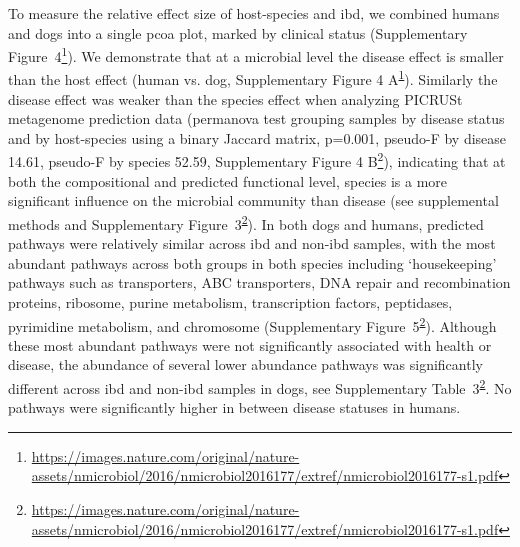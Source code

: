 To measure the relative effect size of host-species and \gls{ibd}, we combined humans and dogs into a single \gls{pcoa} plot, marked by clinical status (Supplementary Figure~4\footnote{\label{sup2}\url{https://images.nature.com/original/nature-assets/nmicrobiol/2016/nmicrobiol2016177/extref/nmicrobiol2016177-s1.pdf}}). We demonstrate that at a microbial level the disease effect is smaller than the host effect (human vs. dog, Supplementary Figure 4 A\textsuperscript{\ref{sup2}}). Similarly the disease effect was weaker than the species effect when analyzing PICRUSt \cite{RN17472} metagenome prediction data (\gls{permanova} test grouping samples by disease status and by host-species using a binary Jaccard matrix, p=0.001, pseudo-F by disease 14.61, pseudo-F by species 52.59, Supplementary Figure 4 B\footnote{\label{sup3}\url{https://images.nature.com/original/nature-assets/nmicrobiol/2016/nmicrobiol2016177/extref/nmicrobiol2016177-s1.pdf}}), indicating that at both the compositional and predicted functional level, species is a more significant influence on the microbial community than disease (see supplemental methods and Supplementary Figure~3\textsuperscript{\ref{sup3}}). In both dogs and humans, predicted pathways were relatively similar across \gls{ibd} and non-\gls{ibd} samples, with the most abundant pathways across both groups in both species including `housekeeping' pathways such as transporters, ABC transporters, DNA repair and recombination proteins, ribosome, purine metabolism, transcription factors, peptidases, pyrimidine metabolism, and chromosome (Supplementary Figure~5\textsuperscript{\ref{sup3}}). Although these most abundant pathways were not significantly associated with health or disease, the abundance of several lower abundance pathways was significantly different across \gls{ibd} and non-\gls{ibd} samples in dogs, see Supplementary Table~3\textsuperscript{\ref{sup3}}. No pathways were significantly higher in between disease statuses in humans.

